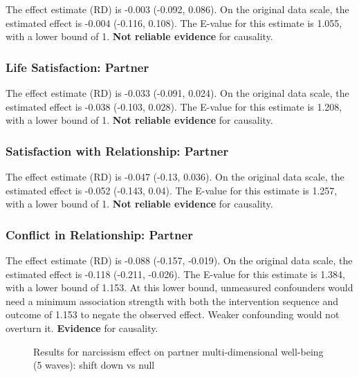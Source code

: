 \documentclass[
  singlecolumn]{article}
\begin{document}
The effect estimate (RD) is -0.003 (-0.092, 0.086). On the original data
scale, the estimated effect is -0.004 (-0.116, 0.108). The E-value for
this estimate is 1.055, with a lower bound of 1. \textbf{Not reliable
evidence} for causality.

\subsubsection{Life Satisfaction:
Partner}\label{life-satisfaction-partner-16}

The effect estimate (RD) is -0.033 (-0.091, 0.024). On the original data
scale, the estimated effect is -0.038 (-0.103, 0.028). The E-value for
this estimate is 1.208, with a lower bound of 1. \textbf{Not reliable
evidence} for causality.

\subsubsection{Satisfaction with Relationship:
Partner}\label{satisfaction-with-relationship-partner-16}

The effect estimate (RD) is -0.047 (-0.13, 0.036). On the original data
scale, the estimated effect is -0.052 (-0.143, 0.04). The E-value for
this estimate is 1.257, with a lower bound of 1. \textbf{Not reliable
evidence} for causality.

\subsubsection{Conflict in Relationship:
Partner}\label{conflict-in-relationship-partner-16}

The effect estimate (RD) is -0.088 (-0.157, -0.019). On the original
data scale, the estimated effect is -0.118 (-0.211, -0.026). The E-value
for this estimate is 1.384, with a lower bound of 1.153. At this lower
bound, unmeasured confounders would need a minimum association strength
with both the intervention sequence and outcome of 1.153 to negate the
observed effect. Weaker confounding would not overturn it.
\textbf{Evidence} for causality.

\begin{figure}


\caption{\label{fig-results-narcissism-partner-down-long}Results for
narcissism effect on partner multi-dimensional well-being (5 waves):
shift down vs null}

\end{figure}%
\end{document}
